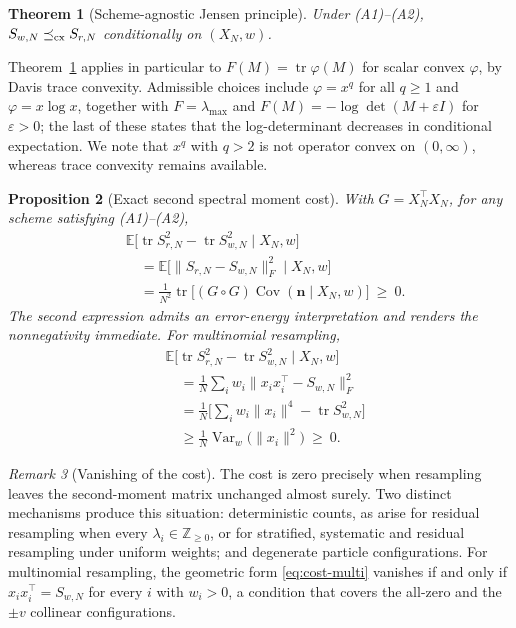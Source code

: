 \documentclass[lettersize,journal]{IEEEtran}
\newtheorem{theo}{Theorem}
\newtheorem{prop}[theo]{Proposition}
\theoremstyle{remark}
\newtheorem{rem}[theo]{Remark}
\begin{document}
\begin{theo}[Scheme-agnostic Jensen principle\cite{hansen1982jensen}]
\label{thm:jensen}
Under (A1)--(A2), $S_{w,N}\preceq_{\rm cx}S_{r,N}$ conditionally on
$(X_N,w)$.
\end{theo}

Theorem~\ref{thm:jensen} applies in particular to
$F(M)=\operatorname{tr}\varphi(M)$ for scalar convex $\varphi$, by Davis trace
convexity\cite{davis1957schwarz}. Admissible choices include $\varphi=x^q$ for all $q\ge1$ and
$\varphi=x\log x$, together with $F=\lambda_{\max}$ and
$F(M)=-\log\det(M+\varepsilon I)$ for $\varepsilon>0$; the last of these
states that the log-determinant decreases in conditional expectation. We note
that $x^q$ with $q>2$ is not operator convex on $(0,\infty)$, whereas trace
convexity remains available.

\begin{prop}[Exact second spectral moment cost\cite{bhatia1997matrix,marshall1979inequalities}]
\label{prop:cost}
With $G=X_N^\top X_N$, for any scheme satisfying (A1)--(A2),
\begin{align}
  &\mathbb{E}\big[\operatorname{tr}S_{r,N}^2-\operatorname{tr}S_{w,N}^2
    \mid X_N,w\big] \nonumber\\
  &\quad=\mathbb{E}\big[\|S_{r,N}-S_{w,N}\|_F^2 \mid X_N,w\big] \nonumber\\
  &\quad=\tfrac{1}{N^2}\operatorname{tr}\big[(G\circ G)
    \operatorname{Cov}(\bm{n}\mid X_N,w)\big]\ \ge\ 0.
  \label{eq:cost-identity}
\end{align}
The second expression admits an error-energy interpretation and renders the
nonnegativity immediate. For multinomial resampling,
\begin{align}
  &\mathbb{E}\big[\operatorname{tr}S_{r,N}^2-\operatorname{tr}S_{w,N}^2
    \mid X_N,w\big] \nonumber\\
  &\quad=\tfrac{1}{N}\sum_i w_i \|x_i x_i^\top - S_{w,N}\|_F^2 \nonumber\\
  &\quad=\tfrac{1}{N}\Big[\sum_i w_i \|x_i\|^4
    - \operatorname{tr}S_{w,N}^2\Big] \nonumber\\
  &\quad\ge \tfrac{1}{N}\operatorname{Var}_w\big(\|x_i\|^2\big)\ \ge\ 0.
  \label{eq:cost-multi}
\end{align}
\end{prop}

\begin{rem}[Vanishing of the cost]
\label{rem:vanish}
The cost is zero precisely when resampling leaves the second-moment matrix
unchanged almost surely. Two distinct mechanisms produce this situation:
deterministic counts, as arise for residual resampling when every
$\lambda_i\in\mathbb{Z}_{\ge0}$, or for stratified, systematic and residual
resampling under uniform weights; and degenerate particle configurations. For
multinomial resampling, the geometric form \eqref{eq:cost-multi} vanishes if
and only if $x_ix_i^\top=S_{w,N}$ for every $i$ with $w_i>0$, a condition that
covers the all-zero and the $\pm v$ collinear configurations.
\end{rem}
\end{document}
